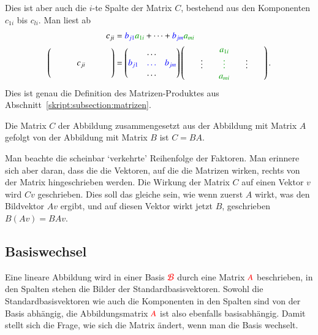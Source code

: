 Dies ist aber auch die $i$-te Spalte der Matrix $C$, bestehend aus den
Komponenten $c_{1i}$ bis $c_{li}$.
Man liest ab
{
\begin{align*}
c_{ji}
&=
{\color{blue}b_{j1}}{\color{darkgreen}a_{1i}} + \dots
	+ {\color{blue}b_{jm}}{\color{darkgreen}a_{mi}}
\\
\begin{pmatrix}
\qquad&\quad&\qquad\\
\phantom{x}&c_{ji}&\phantom{x}\\
\qquad&\quad&\qquad\\
\end{pmatrix}
&=
\begin{pmatrix}
&\dots&\\
\color{blue}b_{j1}&\color{blue}\dots&\color{blue}b_{jm}\\
&\dots&
\end{pmatrix}
\begin{pmatrix}
&\qquad&\color{darkgreen}a_{1i}&\qquad&\\
&\vdots&\color{darkgreen}\vdots&\vdots&\\
&     &\color{darkgreen}a_{mi}&&
\end{pmatrix}.
\end{align*}
}
Dies ist genau die Definition des Matrizen-Produktes aus
Abschnitt~\ref{skript:subsection:matrizen}.

\begin{satz}
Die Matrix $C$ der Abbildung zusammengesetzt aus der Abbildung
mit Matrix $A$ gefolgt von der Abbildung mit Matrix $B$ ist
$C=BA$.
\end{satz}

Man beachte die scheinbar `verkehrte' Reihenfolge der Faktoren.
Man erinnere sich aber daran, dass die die Vektoren, auf die die Matrizen
wirken, rechts von der Matrix hingeschrieben werden.
Die Wirkung der Matrix $C$ auf einen Vektor $v$ wird $Cv$ geschrieben.
Dies soll das gleiche sein, wie wenn zuerst $A$ wirkt, was den Bildvektor
$Av$ ergibt, und auf diesen Vektor wirkt jetzt $B$, geschrieben $B(Av)=BAv$.

%
%
\subsection{Basiswechsel}
Eine lineare Abbildung wird in einer Basis $\color{red}\mathcal{B}$ durch
eine Matrix $\color{red}A$ beschrieben, in den Spalten stehen die Bilder
der Standardbasisvektoren.
Sowohl die Standardbasisvektoren wie auch die Komponenten in den
Spalten sind von der Basis abhängig, die Abbildungsmatrix $\color{red}A$
ist also ebenfalls basisabhängig.
Damit stellt sich die Frage, wie sich die Matrix ändert, wenn
man die Basis wechselt.

